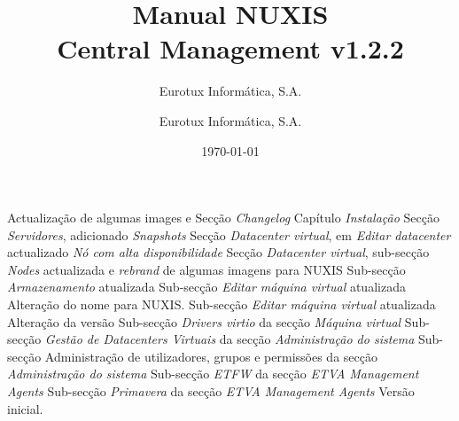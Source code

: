 \documentclass[12pt,a4paper,portuges]{scrreprt}
\author{Eurotux Informática, S.A.}
\title{Manual NUXIS\\ Central Management v1.2.2}
\subtitle{Eurotux Informática, S.A.}
\date{\today}
\begin{document}
\maketitle

\begin{Log}
Actualização de algumas images e Secção \textit{Changelog}
Capítulo \textit{Instalação}
Secção \textit{Servidores}, adicionado \textit{Snapshots}
Secção \textit{Datacenter virtual}, em \textit{Editar datacenter} actualizado \textit{Nó com alta disponibilidade }
Secção \textit{Datacenter virtual}, sub-secção \textit{Nodes} actualizada e \textit{rebrand} de algumas imagens para NUXIS
Sub-secção \textit{Armazenamento} atualizada
Sub-secção \textit{Editar máquina virtual} atualizada
Alteração do nome para NUXIS. Sub-secção \textit{Editar máquina virtual} atualizada
Alteração da versão
Sub-secção \textit{Drivers virtio} da secção \textit{Máquina virtual}
Sub-secção \textit{Gestão de Datacenters Virtuais} da secção \textit{Administração do sistema}
Sub-secção Administração de utilizadores, grupos e permissões da secção \textit{Administração do sistema}
Sub-secção \textit{ETFW} da secção \textit{ETVA Management Agents}
Sub-secção \textit{Primavera} da secção \textit{ETVA Management Agents}
Versão inicial.
\end{Log}

\tableofcontents

\listoffigures


%
%


%


\end{document}
